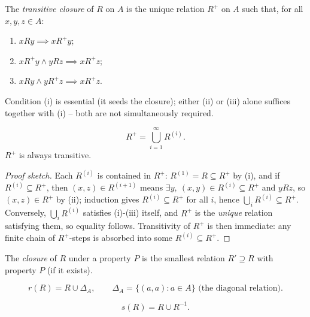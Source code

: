 \begin{definition}
The \emph{transitive closure} of $R$ on $A$ is the unique relation $R^+$ on $A$ such that, for all $x,y,z \in A$:
\begin{enumerate}[label=(\roman*)]
    \item $xRy \implies xR^+y$;
    \item $xR^+y \wedge yRz \implies xR^+z$;
    \item $xRy \wedge yR^+z \implies xR^+z$.
\end{enumerate}
\end{definition}

\begin{note}
Condition (i) is essential (it seeds the closure); either (ii) or (iii) alone suffices together with (i) -- both are not simultaneously required.
\end{note}

\begin{theorem}
\[
R^+ = \bigcup_{i=1}^{\infty} R^{(i)}.
\]
$R^+$ is always transitive.
\end{theorem}
\begin{proof}[Proof sketch]
Each $R^{(i)}$ is contained in $R^+$: $R^{(1)}=R \subseteq R^+$ by (i), and if $R^{(i)} \subseteq R^+$, then $(x,z)\in R^{(i+1)}$ means $\exists y,\ (x,y)\in R^{(i)} \subseteq R^+$ and $yRz$, so $(x,z) \in R^+$ by (ii); induction gives $R^{(i)}\subseteq R^+$ for all $i$, hence $\bigcup_i R^{(i)} \subseteq R^+$. Conversely, $\bigcup_i R^{(i)}$ satisfies (i)-(iii) itself, and $R^+$ is the \emph{unique} relation satisfying them, so equality follows. Transitivity of $R^+$ is then immediate: any finite chain of $R^+$-steps is absorbed into some $R^{(i)} \subseteq R^+$.
\end{proof}

\begin{definition}
The \emph{closure} of $R$ under a property $P$ is the smallest relation $R'\supseteq R$ with property $P$ (if it exists).
\end{definition}

\begin{definition}
\[
r(R) = R \cup \Delta_A, \qquad \Delta_A = \{(a,a):a\in A\} \text{ (the diagonal relation)}.
\]
\end{definition}

\begin{definition}
\[
s(R) = R \cup R^{-1}.
\]
\end{definition}

